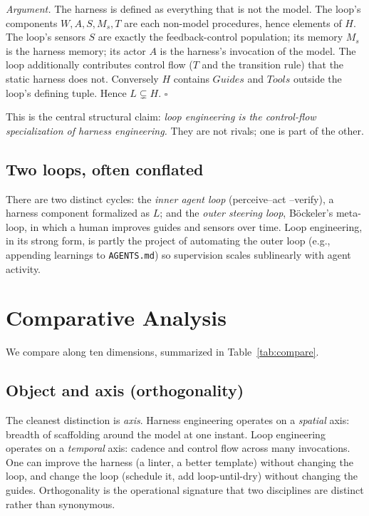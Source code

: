 \documentclass[10pt,twocolumn,letterpaper]{article}
\begin{document}
\noindent\emph{Argument.} The harness is defined as everything that is not the
model. The loop's components $W, A, S, M_s, T$ are each non-model procedures,
hence elements of $H$. The loop's sensors $S$ are exactly the feedback-control
population; its memory $M_s$ is the harness memory; its actor $A$ is the
harness's invocation of the model. The loop additionally contributes control
flow ($T$ and the transition rule) that the static harness does not. Conversely
$H$ contains $\mathit{Guides}$ and $\mathit{Tools}$ outside the loop's defining
tuple. Hence $L \subsetneq H$. \hfill$\square$

This is the central structural claim: \emph{loop engineering is the control-flow
specialization of harness engineering.} They are not rivals; one is part of the
other.

\subsection{Two loops, often conflated}
There are two distinct cycles: the \emph{inner agent loop} (perceive--act
--verify), a harness component formalized as $L$; and the \emph{outer steering
loop}, B\"ockeler's meta-loop, in which a human improves guides and sensors over
time. Loop engineering, in its strong form, is partly the project of automating
the outer loop (e.g., appending learnings to \texttt{AGENTS.md}) so supervision
scales sublinearly with agent activity.

\section{Comparative Analysis}
\label{sec:compare}
We compare along ten dimensions, summarized in Table~\ref{tab:compare}.

\subsection{Object and axis (orthogonality)}
The cleanest distinction is \emph{axis}. Harness engineering operates on a
\emph{spatial} axis: breadth of scaffolding around the model at one instant.
Loop engineering operates on a \emph{temporal} axis: cadence and control flow
across many invocations. One can improve the harness (a linter, a better
template) without changing the loop, and change the loop (schedule it, add
loop-until-dry) without changing the guides. Orthogonality is the operational
signature that two disciplines are distinct rather than synonymous.
\end{document}
